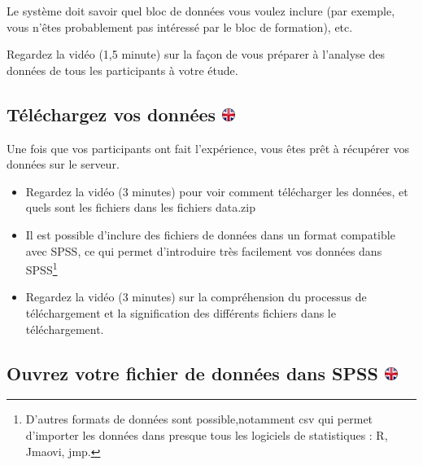 \documentclass[
]{book}
\providecommand{\tightlist}{%
  \setlength{\itemsep}{0pt}\setlength{\parskip}{0pt}}
\begin{document}
Le système doit savoir quel bloc de données vous voulez inclure (par exemple, vous n'êtes probablement pas intéressé par le bloc de formation), etc.

Regardez la vidéo (1,5 minute) sur la façon de vous préparer à l'analyse des données de tous les participants à votre étude.

\hypertarget{tuxe9luxe9chargez-vos-donnuxe9es}{%
\subsection[Téléchargez vos données ]{\texorpdfstring{Téléchargez vos données \href{https://www.psytoolkit.org/lessons/project.html\#_download_your_data}{\protect\includegraphics{img/ukflag.png}}}{Téléchargez vos données }}\label{tuxe9luxe9chargez-vos-donnuxe9es}}

Une fois que vos participants ont fait l'expérience, vous êtes prêt à récupérer vos données sur le serveur.

\begin{itemize}
\tightlist
\item
  Regardez la vidéo (3 minutes) pour voir comment télécharger les données, et quels sont les fichiers dans les fichiers data.zip
\item
  Il est possible d'inclure des fichiers de données dans un format compatible avec SPSS, ce qui permet d'introduire très facilement vos données dans SPSS\footnote{D'autres formats de données sont possible,notamment csv qui permet d'importer les données dans presque tous les logiciels de statistiques : R, Jmaovi, jmp.}
\item
  Regardez la vidéo (3 minutes) sur la compréhension du processus de téléchargement et la signification des différents fichiers dans le téléchargement.
\end{itemize}

\hypertarget{ouvrez-votre-fichier-de-donnuxe9es-dans-spss}{%
\subsection[Ouvrez votre fichier de données dans SPSS ]{\texorpdfstring{Ouvrez votre fichier de données dans SPSS \href{https://www.psytoolkit.org/lessons/project.html\#_open_your_data_file_in_spss}{\protect\includegraphics{img/ukflag.png}}}{Ouvrez votre fichier de données dans SPSS }}\label{ouvrez-votre-fichier-de-donnuxe9es-dans-spss}}
\end{document}
